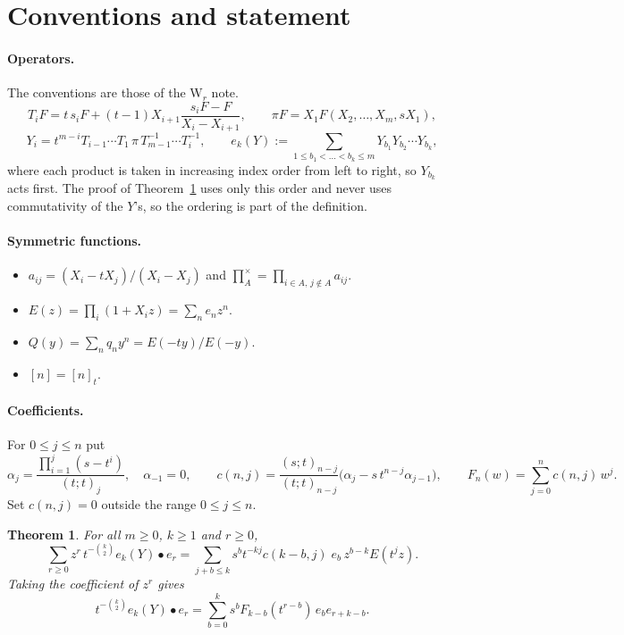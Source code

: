 \documentclass[11pt]{amsart}
\newtheorem{theorem}{Theorem}
\theoremstyle{remark}
\newcommand{\cross}{\textstyle\prod^{\times}}
\newcommand{\poch}[2]{(#1;t)_{#2}}
\begin{document}
\section{Conventions and statement}

\paragraph{Operators.} The conventions are those of the W$_r$ note.
\[
T_iF=t\,s_iF+(t-1)X_{i+1}\frac{s_iF-F}{X_i-X_{i+1}},\qquad
\pi F=X_1F(X_2,\dots,X_m,sX_1),\]
\[Y_i=t^{m-i}T_{i-1}\cdots T_1\,\pi\,T_{m-1}^{-1}\cdots T_i^{-1},\qquad
e_k(Y):=\sum_{1\le b_1<\dots<b_k\le m}Y_{b_1}Y_{b_2}\cdots Y_{b_k},
\]
where each product is taken in increasing index order from left to right, so $Y_{b_k}$ acts first. The proof of Theorem~\ref{thm:main} uses only this order and never uses commutativity of the $Y$'s, so the ordering is part of the definition.

\paragraph{Symmetric functions.}
\begin{itemize}
\item $a_{ij}=(X_i-tX_j)/(X_i-X_j)$ and $\cross_A=\prod_{i\in A,\,j\notin A}a_{ij}$.
\item $E(z)=\prod_i(1+X_iz)=\sum_n e_nz^n$.
\item $Q(y)=\sum_n q_ny^n=E(-ty)/E(-y)$.
\item $[n]=[n]_t$.
\end{itemize}

\paragraph{Coefficients.} For $0\le j\le n$ put
\begin{equation}\label{eq:c}
\alpha_j=\frac{\prod_{i=1}^{j}(s-t^i)}{\poch tj},\quad \alpha_{-1}=0,\qquad
c(n,j)=\frac{\poch s{n-j}}{\poch t{n-j}}\bigl(\alpha_j-s\,t^{n-j}\alpha_{j-1}\bigr),\qquad
F_n(w)=\sum_{j=0}^n c(n,j)\,w^j .
\end{equation}
Set $c(n,j)=0$ outside the range $0\le j\le n$.

\begin{theorem}\label{thm:main}
For all $m\ge0$, $k\ge1$ and $r\ge0$,
\[
\sum_{r\ge0} z^r\,t^{-\binom k2}e_k(Y)\bullet e_r
=\sum_{j+b\le k}s^b t^{-kj}c(k-b,j)\;e_b\,z^{b-k}E(t^jz).
\]
Taking the coefficient of $z^r$ gives
\[
t^{-\binom k2}e_k(Y)\bullet e_r=\sum_{b=0}^k s^bF_{k-b}(t^{r-b})\,e_b e_{r+k-b}.
\]
\end{theorem}
\end{document}
